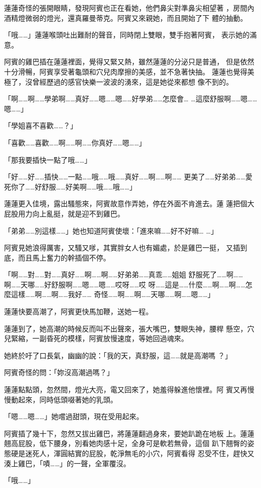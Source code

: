 蓮蓮奇怪的張開眼睛，發現阿賓也正在看她，他們鼻尖對準鼻尖相望著
，房間內酒精燈微弱的燈光，還真羅曼蒂克。阿賓又來親她，而且開始了下
體的抽動。

「哦……」蓮蓮喉頭吐出難耐的聲音，同時閉上雙眼，雙手抱著阿賓，
表示她的滿意。

阿賓的雞巴插在蓮蓮裡面，覺得又緊又熱，雖然蓮蓮的分泌只是普通，
但是依然十分滑暢，阿賓享受著龜頭和穴兒肉摩擦的美感，並不急著快抽。
蓮蓮也覺得美極了，沒曾經歷過的感官快樂一波波的湧來，這是她從來都想
像不到的。

「啊……啊……學弟啊……真好……嗯……嗯……好學弟……怎麼會…
…這麼舒服啊……嗯……嗯……」

「學姐喜不喜歡……？」

「喜歡……喜歡……啊……啊……你真好……嗯……」

「那我要插快一點了哦……」

「好……好……插快……一點……哦……哦……真好……啊……啊……
更美了……好弟弟……愛死你了……好舒服……好美啊……哦……哦……」

蓮蓮更入佳境，露出騷態來，阿賓故意作弄她，停在外面不肯進去。蓮
蓮把個大屁股用力向上亂挺，就是迎不到雞巴。

「弟弟……別這樣……」她也知道阿賓使壞：「進來嘛……好不好嘛…
…」

阿賓見她浪得厲害，又騷又嗲，其實胖女人也有媚處，於是雞巴一挺，
又插到底，而且馬上奮力的幹插個不停。

「啊……對……對……真好……啊……啊……好弟弟……真乖……姐姐
舒服死了……啊……啊……天哪……好舒服啊……嗯……嗯……哎呀……哎
呀……這是……什麼……啊……啊……怎麼這樣……啊……啊……我好……
奇怪……啊……啊……天哪……啊……嗯……」

蓮蓮快要高潮了，阿賓更快馬加鞭，送她一程。

蓮蓮到了，她高潮的時候反而叫不出聲來，張大嘴巴，雙眼失神，腰桿
懸空，穴兒緊縮，一副昏死的模樣，阿賓放慢速度，等她回過魂來。

她終於吁了口長氣，幽幽的說：「我的天，真舒服，這……就是高潮嗎
？」

阿賓奇怪的問：「妳沒高潮過嗎？」

蓮蓮點點頭，忽然間，燈光大亮，電又回來了，她羞得躲進他懷裡。阿
賓又再慢慢動起來，同時低頭啜著她的乳頭。

「嗯……嗯……」她嚐過甜頭，現在受用起來。

阿賓插了幾十下，忽然又拔出雞巴，將蓮蓮翻過身來，要她趴跪在地板
上。蓮蓮翹高屁股，低下腰身，別看她肉感十足，全身可是軟若無骨，這個
趴下翹臀的姿態硬是迷死人，渾圓結實的屁股，乾淨無毛的小穴，阿賓看得
忍受不住，趕快又湊上雞巴，「嘖……」的一聲，全軍覆沒。

「哦……」

